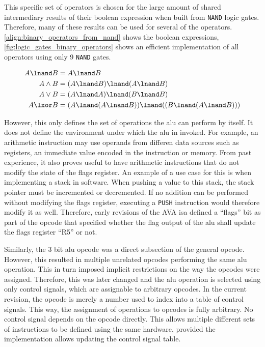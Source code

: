 This specific set of operators is chosen for the large amount of shared intermediary results of their boolean expression when built from \texttt{NAND} logic gates. Therefore, many of these results can be used for several of the operators. \autoref{align:binary_operators_from_nand} shows the boolean expressions, \autoref{fig:logic_gates_binary_operators} shows an efficient implementation of all operators using only 9 \texttt{NAND} gates.

\begin{align}
    A \lnand B &= A \lnand B \\
    A \land B  &= (A \lnand B) \lnand (A \lnand B) \\
    A \lor B   &= (A \lnand A) \lnand (B \lnand B) \\
    A \lxor B  &= (A \lnand (A \lnand B)) \lnand ((B \lnand (A \lnand B)))
\end{align}
\label{align:binary_operators_from_nand}
\vspace{\baselineskip}

However, this only defines the set of operations the \ac{alu} can perform by itself. It does not define the environment under which the \ac{alu} in invoked. For example, an arithmetic instruction may use operands from differen data sources such as registers, an immediate value encoded in the instruction or memory. From past experience, it also proves useful to have arithmetic instructions that do not modify the state of the flags register. An example of a use case for this is when implementing a stack in software. When pushing a value to this stack, the stack pointer must be incremented or decremented. If no addition can be performed without modifying the flags register, executing a \texttt{PUSH} instruction would therefore modify it as well. Therefore, early revisions of the AVA \ac{isa} defined a ``flags'' bit as part of the opcode that specified whether the flag output of the \ac{alu} shall update the flags register ``R5'' or not. 

Similarly, the 3 bit \ac{alu} opcode was a direct subsection of the general opcode. However, this resulted in multiple unrelated opcodes performing the same \ac{alu} operation. This in turn imposed implicit restrictions on the way the opcodes were assigned. Therefore, this was later changed and the \ac{alu} operation is selected using only control signals, which are assignable to arbitrary opcodes. In the current revision, the opcode is merely a number used to index into a table of control signals. This way, the assignment of operations to opcodes is fully arbitrary. No control signal depends on the opcode directly. This allows multiple different sets of instructions to be defined using the same hardware, provided the implementation allows updating the control signal table.

